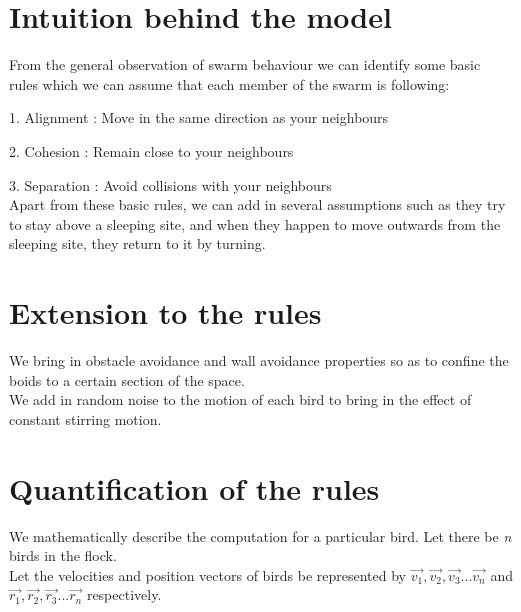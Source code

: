 \documentclass[a4paper,11pt,openany]{book}
\begin{document}
\section{Intuition behind the model}
From the general observation of swarm behaviour we can identify some basic rules which we can assume that each member of the swarm is following:

1. Alignment : Move in the same direction as your neighbours

2. Cohesion : Remain close to your neighbours

3. Separation : Avoid collisions with your neighbours
\\
Apart from these basic rules, we can add in several assumptions such as they try to stay above a sleeping site, and when they happen to move outwards from the sleeping site, they return to it by turning. 


\section{Extension to the rules}
We bring in obstacle avoidance and wall avoidance properties so as to confine the boids to a certain section of the space.
\\
We add in random noise to the motion of each bird to bring in the effect of constant stirring motion.


\section{Quantification of the rules}
We mathematically describe the computation for a particular bird. Let there be \emph{n} birds in the flock.\\
Let the velocities and position vectors of birds be represented by $\vec{v_1},\vec{v_2},\vec{v_3} ... \vec{v_n}$ and $\vec{r_1},\vec{r_2},\vec{r_3} ... \vec{r_n}$ respectively. 
\end{document}
